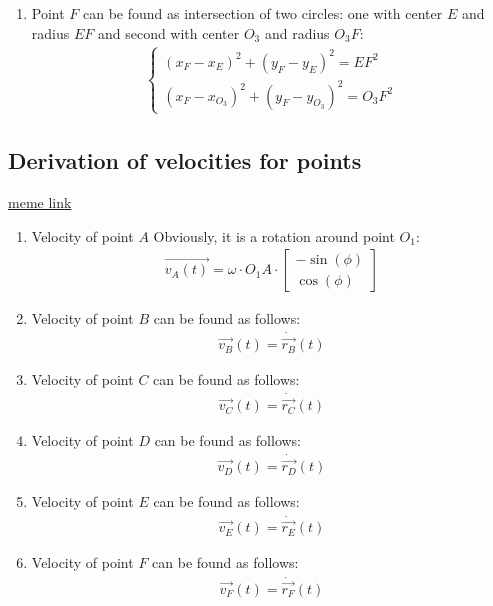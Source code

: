 \begin{enumerate}
    \item Point $F$ can be found as intersection of two circles: one with center $E$ and radius $EF$ and second with center $O_3$ and radius $O_3F$:
          \begin{align}
              \begin{cases}
                  (x_F - x_E)^2 + (y_F - y_E)^2 = EF^2 \\
                  (x_F - x_{O_3})^2 + (y_F - y_{O_3})^2 = O_3F^2
              \end{cases}
          \end{align}


\end{enumerate}

\subsection{Derivation of velocities for points}
\href{https://www.youtube.com/watch?v=l7jCZV_lIHM}{meme link}

\begin{enumerate}
    \item Velocity of point $A$
          Obviously, it is a rotation around point $O_1$:
          \begin{align}
              \vec{v_A(t)} = \omega \cdot O_1A \cdot \begin{bmatrix}
                  -\sin(\phi) \\
                  \cos(\phi)
              \end{bmatrix}
          \end{align}

    \item Velocity of point $B$ can be found as follows:
          \begin{align}
              \vec{v_B}(t) = \dot{\vec{r_B}}(t)
          \end{align}
    \item Velocity of point $C$ can be found as follows:
          \begin{align}
              \vec{v_C}(t) = \dot{\vec{r_C}}(t)
          \end{align}

    \item Velocity of point $D$ can be found as follows:
          \begin{align}
              \vec{v_D}(t) = \dot{\vec{r_D}}(t)
          \end{align}

    \item Velocity of point $E$ can be found as follows:
          \begin{align}
              \vec{v_E}(t) = \dot{\vec{r_E}}(t)
          \end{align}

    \item Velocity of point $F$ can be found as follows:
          \begin{align}
              \vec{v_F}(t) = \dot{\vec{r_F}}(t)
          \end{align}



\end{enumerate}

